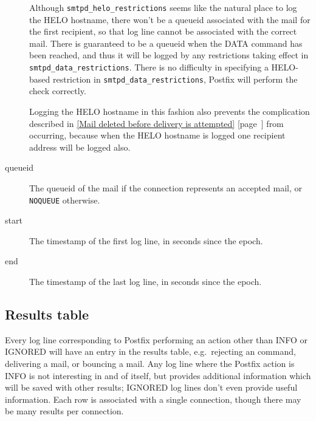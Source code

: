 \documentclass[a4paper,12pt,draft]{article}
\newcommand{\refwithpage}[1]{%
    \empty{}\ref{#1} [page~\pageref{#1}]%
}
\newcommand{\sectionref}[1]{%
    \textsection{}\refwithpage{#1}%
}
\begin{document}
\begin{description}
\begin{enumerate}
        \end{enumerate}

        Although \texttt{smtpd\_helo\_restrictions} seems like the natural
        place to log the HELO hostname, there won't be a queueid associated
        with the mail for the first recipient, so that log line cannot be
        associated with the correct mail.  There is guaranteed to be a
        queueid when the DATA command has been reached, and thus it will be
        logged by any restrictions taking effect in
        \texttt{smtpd\_data\_restrictions}.  There is no difficulty in
        specifying a HELO-based restriction in
        \texttt{smtpd\_data\_restrictions}, Postfix will perform the check
        correctly.

        Logging the HELO hostname in this fashion also prevents the
        complication described in \sectionref{Mail deleted before delivery
        is attempted} from occurring, because when the HELO hostname is
        logged one recipient address will be logged also.

    \item [queueid] The queueid of the mail if the connection represents an
        accepted mail, or \texttt{NOQUEUE} otherwise.

    \item [start] The timestamp of the first log line, in seconds since the
        epoch.

    \item [end] The timestamp of the last log line, in seconds since the
        epoch.

\end{description}

\subsection{Results table}

\label{results table}

Every log line corresponding to Postfix performing an action other than
INFO or IGNORED will have an entry in the results table, e.g.\ rejecting an
\SMTP{} command, delivering a mail, or bouncing a mail.  Any log line where
the Postfix action is INFO is not interesting in and of itself, but
provides additional information which will be saved with other results;
IGNORED log lines don't even provide useful information.  Each row is
associated with a single connection, though there may be many results per
connection.
\end{document}
